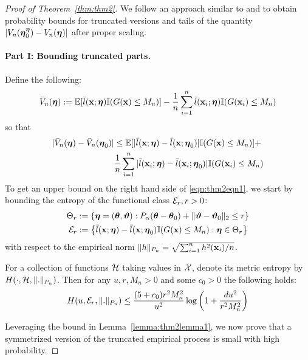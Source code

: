\documentclass[11pt,letterpaper]{article}
\numberwithin{equation}{section}
\begin{document}
\begin{proof}[Proof of Theorem~\ref{thm:thm2}]
We follow an approach similar to \cite{StadlerEtal10} and \cite{FengSimon17} to obtain probability bounds for truncated versions and tails of the quantity $|V_n({\boldsymbol{\eta}}_0^{\boldsymbol{\eta}}) - V_n({\boldsymbol{\eta}})|$ after proper scaling.

\paragraph{Part I: Bounding truncated parts.} Define the following:
%
\begin{align*}
\bar V_n({\boldsymbol{\eta}}) := {\mathbb{E}} [\bar l({\bf{x}}; {\boldsymbol{\eta}}) {\mathbb{I}}(G({\bf{x}}) \leq M_n)] -
\frac{1}{n} \sum_{i=1}^n\bar l({\bf{x}}_i; {\boldsymbol{\eta}}) {\mathbb{I}}(G({\bf{x}}_i) \leq M_n)
\end{align*}
%
so that
\begin{align}
| \bar V_n({\boldsymbol{\eta}}) - \bar V_n({\boldsymbol{\eta}}_0) | & \leq
{\mathbb{E}} [| \bar l({\bf{x}}; {\boldsymbol{\eta}}) -  \bar l({\bf{x}}; {\boldsymbol{\eta}}_0)| {\mathbb{I}}(G({\bf{x}}) \leq M_n)] + \notag\\
& \frac{1}{n} \sum_{i=1}^n | \bar l({\bf{x}}_i; {\boldsymbol{\eta}}) -  \bar l({\bf{x}}_i; {\boldsymbol{\eta}}_0)| {\mathbb{I}}(G({\bf{x}}_i) \leq M_n)
\label{eqn:thm2eqn1}
\end{align}
%
To get an upper bound on the right hand side of \eqref{eqn:thm2eqn1}, we start by bounding the entropy of the functional class ${\cal{E}}_r, r >0$:
%
\begin{align*}
\Theta_r & := \{ {\boldsymbol{\eta}} = ({\boldsymbol{\theta}}, {\boldsymbol{\vartheta}}): 
P_\alpha({\boldsymbol{\theta}} - {\boldsymbol{\theta}}_0) + \| {\boldsymbol{\vartheta}} - {\boldsymbol{\vartheta}}_0 \|_2 \leq r \}\\
{\cal{E}}_r & := \left\{ \bar l({\bf{x}}; {\boldsymbol{\eta}}) -  \bar l({\bf{x}}; {\boldsymbol{\eta}}_0) {\mathbb{I}}(G({\bf{x}}) \leq M_n): {\boldsymbol{\eta}} \in \Theta_r
\right\}
\end{align*}
%
with respect to the empirical norm $\| h \|_{P_n} = \sqrt{\sum_{i=1}^n h^2 ({\bf{x}}_i)/n}$.

\begin{Lemma}\label{lemma:thm2lemma1}
For a collection of functions ${\cal{H}}$ taking values in ${\cal{X}}$, denote its metric entropy by $H(\cdot, {\cal{H}}, \|.\|_{P_n})$. Then for any $u, r, M_n>0$ and some $c_0 > 0$ the following holds:
%
$$
H(u, {\cal{E}}_r, \|.\|_{P_n}) \leq \frac{ (5 + c_0) r^2 M_n^2}{u^2}
\log \left(1 + \frac{d u^2}{r^2 M_n^2} \right)
$$
%
\end{Lemma}

Leveraging the bound in Lemma~\ref{lemma:thm2lemma1}, we now prove that a symmetrized version of the truncated empirical process is small with high probability.


\end{proof}
\end{document}
